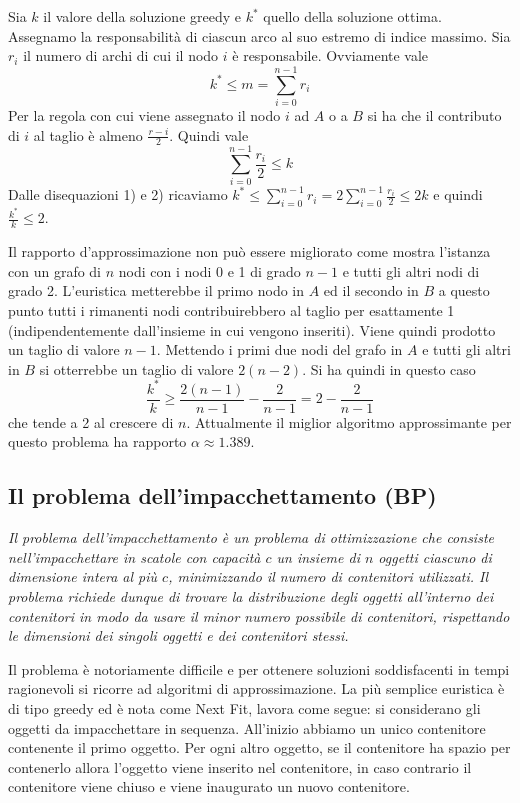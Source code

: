 Sia $k$ il valore della soluzione greedy e $k^*$ quello della soluzione ottima. Assegnamo la responsabilità di ciascun arco al suo estremo di indice massimo. Sia $r_i$ il numero di archi di cui il nodo $i$ è responsabile. Ovviamente vale
\begin{equation*}
    k^* \leq m = \sum^{n-1}_{i=0}r_i
\end{equation*}
Per la regola con cui viene assegnato il nodo $i$ ad $A$ o a $B$ si ha che il contributo di $i$ al taglio è almeno $\frac{r-i}{2}$. Quindi vale
\begin{equation*}
    \sum^{n-1}_{i=0}\frac{r_i}{2}\leq k
\end{equation*}
Dalle disequazioni 1) e 2) ricaviamo $k^* \leq \sum^{n-1}_{i=0}r_i=2\sum^{n-1}_{i=0}\frac{r_i}{2}\leq 2k$ e quindi $\frac{k^*}{k}\leq 2$.

Il rapporto d'approssimazione non può essere migliorato come mostra l'istanza con un grafo di $n$ nodi con i nodi 0 e 1 di grado $n - 1$ e tutti gli altri nodi di grado 2. L'euristica metterebbe il primo nodo in $A$ ed il secondo in $B$ a questo punto tutti i rimanenti nodi contribuirebbero al taglio per esattamente 1 (indipendentemente dall'insieme in cui vengono inseriti). Viene quindi prodotto un taglio di valore $n - 1$. Mettendo i primi due nodi del grafo in $A$ e tutti gli altri in $B$ si otterrebbe un taglio di valore $2(n - 2)$. Si ha quindi in questo caso
\begin{equation*}
    \frac{k^*}{k}\geq \frac{2(n-1)}{n-1}-\frac{2}{n-1}=2-\frac{2}{n-1}
\end{equation*}
che tende a 2 al crescere di $n$. Attualmente il miglior algoritmo approssimante per questo problema ha rapporto $\alpha \approx 1.389$.

\subsection{Il problema dell'impacchettamento (BP)}
\textit{Il problema dell'impacchettamento è un problema di ottimizzazione che consiste nell'impacchettare in scatole con capacità $c$ un insieme di $n$ oggetti ciascuno di dimensione intera al più $c$, minimizzando il numero di contenitori utilizzati.
Il problema richiede dunque di trovare la distribuzione degli oggetti all'interno
dei contenitori in modo da usare il minor numero possibile di contenitori, rispettando le dimensioni dei singoli oggetti e dei contenitori stessi.}

Il problema è notoriamente difficile e per ottenere soluzioni soddisfacenti in tempi ragionevoli si ricorre ad algoritmi di approssimazione. La più semplice euristica è di tipo greedy ed è nota come Next Fit, lavora come segue: si considerano gli oggetti da impacchettare in sequenza. All'inizio abbiamo un unico contenitore contenente il primo oggetto. Per ogni altro oggetto, se il contenitore ha spazio per contenerlo allora l'oggetto viene inserito nel contenitore, in caso contrario il contenitore viene chiuso e viene inaugurato un nuovo contenitore.

